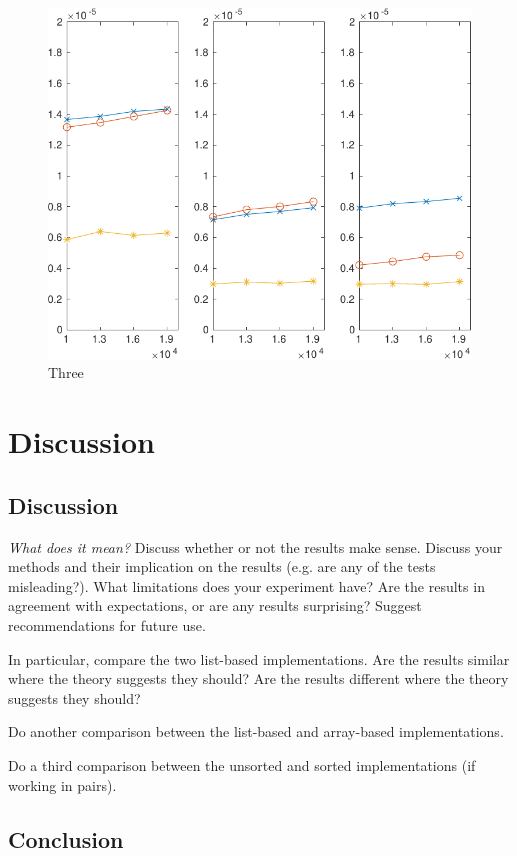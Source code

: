 \documentclass[10pt, titlepage, oneside, a4paper]{article}
\begin{document}
\begin{figure}
\begin{center}
\includegraphics[width=0.75\hsize]{fig3.pdf}
\end{center}
\caption{Three}
\label{fig:fig3}
\end{figure}

\section{Discussion}
\label{sec:discussion}
\subsection{Discussion}
\label{sec:orgb165220}
\emph{What does it mean?} Discuss whether or not the results make sense.
Discuss your methods and their implication on the results (e.g. are
any of the tests misleading?). What limitations does your experiment
have? Are the results in agreement with expectations, or are any
results surprising? Suggest recommendations for future use.

In particular, compare the two list-based implementations. Are the
results similar where the theory suggests they should?  Are the
results different where the theory suggests they should?

Do another comparison between the list-based and array-based
implementations.

Do a third comparison between the unsorted and sorted implementations
(if working in pairs).

\subsection{Conclusion}
\label{sec:orgb4cc8ea}
\end{document}
